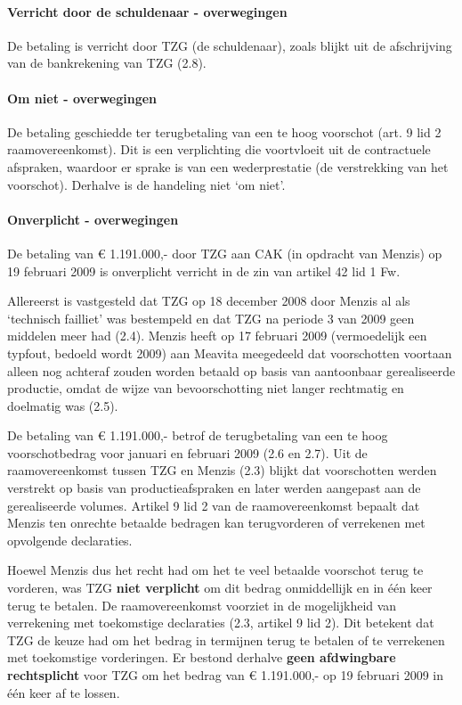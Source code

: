 \documentclass[
  dutch,
  a4paper,
]{article}
\begin{document}
\paragraph{Verricht door de schuldenaar - overwegingen}\label{verricht-door-de-schuldenaar---overwegingen-84}

De betaling is verricht door TZG (de schuldenaar), zoals blijkt uit de afschrijving van de bankrekening van TZG (2.8).

\paragraph{Om niet - overwegingen}\label{om-niet---overwegingen-84}

De betaling geschiedde ter terugbetaling van een te hoog voorschot (art. 9 lid 2 raamovereenkomst). Dit is een verplichting die voortvloeit uit de contractuele afspraken, waardoor er sprake is van een wederprestatie (de verstrekking van het voorschot). Derhalve is de handeling niet `om niet'.

\paragraph{Onverplicht - overwegingen}\label{onverplicht---overwegingen-84}

De betaling van € 1.191.000,- door TZG aan CAK (in opdracht van Menzis) op 19 februari 2009 is onverplicht verricht in de zin van artikel 42 lid 1 Fw.

Allereerst is vastgesteld dat TZG op 18 december 2008 door Menzis al als `technisch failliet' was bestempeld en dat TZG na periode 3 van 2009 geen middelen meer had (2.4). Menzis heeft op 17 februari 2009 (vermoedelijk een typfout, bedoeld wordt 2009) aan Meavita meegedeeld dat voorschotten voortaan alleen nog achteraf zouden worden betaald op basis van aantoonbaar gerealiseerde productie, omdat de wijze van bevoorschotting niet langer rechtmatig en doelmatig was (2.5).

De betaling van € 1.191.000,- betrof de terugbetaling van een te hoog voorschotbedrag voor januari en februari 2009 (2.6 en 2.7). Uit de raamovereenkomst tussen TZG en Menzis (2.3) blijkt dat voorschotten werden verstrekt op basis van productieafspraken en later werden aangepast aan de gerealiseerde volumes. Artikel 9 lid 2 van de raamovereenkomst bepaalt dat Menzis ten onrechte betaalde bedragen kan terugvorderen of verrekenen met opvolgende declaraties.

Hoewel Menzis dus het recht had om het te veel betaalde voorschot terug te vorderen, was TZG \textbf{niet verplicht} om dit bedrag onmiddellijk en in één keer terug te betalen. De raamovereenkomst voorziet in de mogelijkheid van verrekening met toekomstige declaraties (2.3, artikel 9 lid 2). Dit betekent dat TZG de keuze had om het bedrag in termijnen terug te betalen of te verrekenen met toekomstige vorderingen. Er bestond derhalve \textbf{geen afdwingbare rechtsplicht} voor TZG om het bedrag van € 1.191.000,- op 19 februari 2009 in één keer af te lossen.
\end{document}
